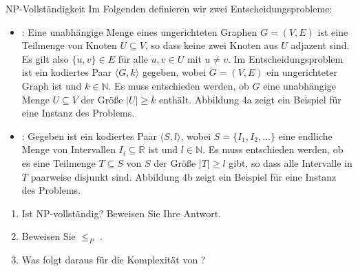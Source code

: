 \documentclass{article}
\begin{document}
\begin{exercise}{NP-Vollständigkeit}
  Im Folgenden definieren wir zwei Entscheidungsprobleme:
  \begin{itemize}
    \item {}: Eine unabhängige Menge eines ungerichteten Graphen $G = (V,E)$ ist eine Teilmenge von Knoten $U \subseteq V$, so dass keine zwei Knoten aus $U$ adjazent sind. Es gilt also $\{u,v\} \in E$ für alle $u,v \in U$ mit $u \neq v$. Im Entscheidungsproblem  ist ein kodiertes Paar $\langle G, k \rangle$ gegeben, wobei $G = (V,E)$ ein ungerichteter Graph ist und $k \in \mathbb{N}$. Es muss entschieden werden, ob $G$ eine unabhängige Menge $U \subseteq V$ der Größe $|U| \geq k$ enthält. Abbildung 4a zeigt ein Beispiel für eine Instanz des Problems.
    \item {}: Gegeben ist ein kodiertes Paar $\langle S, l \rangle$, wobei $S = \{I_1, I_2, \dots\}$ eine endliche Menge von Intervallen $I_i \subseteq \mathbb{R}$ ist und $l \in \mathbb{N}$. Es muss entschieden werden, ob es eine Teilmenge $T \subseteq S$ von $S$ der Größe $|T| \geq l$ gibt, so dass alle Intervalle in $T$ paarweise disjunkt sind. Abbildung 4b zeigt ein Beispiel für eine Instanz des Problems.
  \end{itemize}
  \begin{enumerate}
    \item Ist  NP-vollständig? Beweisen Sie Ihre Antwort.
    \item Beweisen Sie  $\leq_P$ .
    \item Was folgt daraus für die Komplexität von ?
  \end{enumerate}
  

  \begin{solution}

  \end{solution}
\end{exercise}
\end{document}
